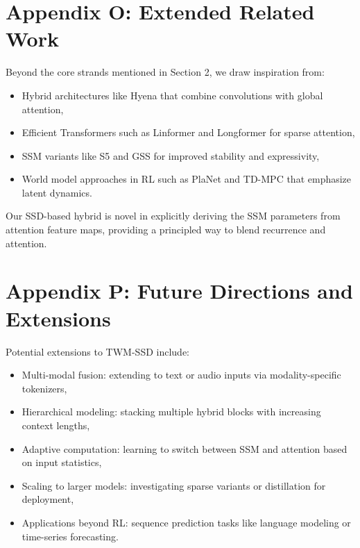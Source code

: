 \documentclass{article}
\begin{document}
\section{Appendix O: Extended Related Work}
Beyond the core strands mentioned in Section 2, we draw inspiration from:
\begin{itemize}
  \item Hybrid architectures like Hyena \cite{poli2023hyena} that combine convolutions with global attention,
  \item Efficient Transformers such as Linformer \cite{wang2020linformer} and Longformer \cite{beltagy2020longformer} for sparse attention,
  \item SSM variants like S5 \cite{smith2022simplified} and GSS \cite{mehta2023long} for improved stability and expressivity,
  \item World model approaches in RL such as PlaNet \cite{hafner2019planet} and TD-MPC \cite{hansen2022temporal} that emphasize latent dynamics.
\end{itemize}
Our SSD-based hybrid is novel in explicitly deriving the SSM parameters from attention feature maps, providing a principled way to blend recurrence and attention.

\section{Appendix P: Future Directions and Extensions}
Potential extensions to TWM-SSD include:
\begin{itemize}
  \item Multi-modal fusion: extending to text or audio inputs via modality-specific tokenizers,
  \item Hierarchical modeling: stacking multiple hybrid blocks with increasing context lengths,
  \item Adaptive computation: learning to switch between SSM and attention based on input statistics,
  \item Scaling to larger models: investigating sparse variants or distillation for deployment,
  \item Applications beyond RL: sequence prediction tasks like language modeling or time-series forecasting.
\end{itemize}
\end{document}
